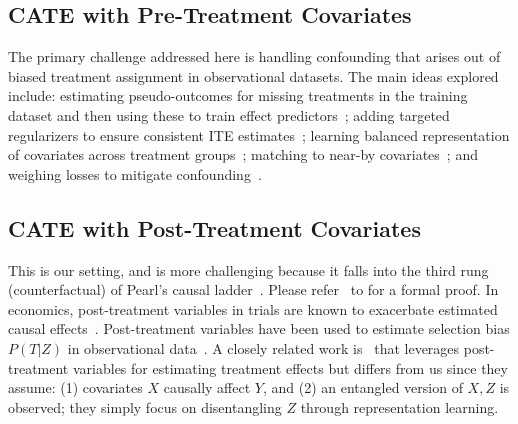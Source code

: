 

\subsection{CATE with Pre-Treatment Covariates} 
The primary challenge addressed here is handling confounding that arises out of biased treatment assignment in observational datasets.
The main ideas explored include: estimating pseudo-outcomes for missing treatments in the training dataset and then using these to train effect predictors~\citep{Gao2020, inducbias, rlearner, drlearner, ganite, overlapping_rep, giks};  adding targeted regularizers to ensure consistent ITE estimates~\citep{dragonnet, vcnet, TransTEE}; learning balanced representation of covariates across treatment groups~\citep{Tarnet, cfrnet, replearning_ite, chauhan2023adversarial, escfr, stablecfr}; matching to near-by covariates~\citep{matching_survey,  prop_score_matching, coarsened_exact_matching, perfect_match, deepmatch, pairnet}; and weighing losses to mitigate confounding~\citep{ctr_importance, disentangled_ite, weighted_factual, weighted_factual_2}.  

\subsection{CATE with Post-Treatment Covariates} 
This is our setting, and is more challenging because it falls into the third rung (counterfactual) of Pearl's causal ladder~\citep{pearlbook}. Please refer~\citep{post_cf_proof} \begingroup
\tmlr
to
\endgroup
for a formal proof.
In economics, post-treatment variables in trials are known to exacerbate estimated causal effects~\citep{post_trial_1, post_trial_2, post_trial_3}. Post-treatment variables have been used to estimate selection bias $P(T|Z)$ in observational data~\citep{post_selbias_1, post_selbias_2, sel_bias_3}. A closely related work  is~\citep{huang2023extracting} that leverages post-treatment variables for estimating treatment effects but differs from us since they assume: (1) covariates $X$ causally affect $Y$, and (2) an entangled version of $X, Z$ is observed; they simply focus on disentangling $Z$ through representation learning. 

